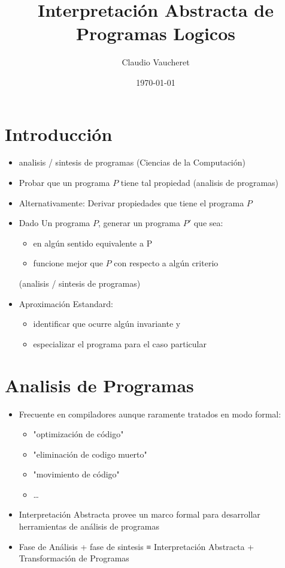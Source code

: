 \documentclass[11pt]{article}
\author{Claudio Vaucheret}
\date{\today}
\title{Interpretación Abstracta de Programas Logicos}
\begin{document}
\maketitle
\tableofcontents


\section*{Introducción}
\label{sec:org2daf528}

\begin{itemize}
\item analisis / sintesis de programas (Ciencias de la Computación)

\item Probar que un programa \(P\) tiene tal propiedad (analisis de programas)

\item Alternativamente: Derivar propiedades que tiene el programa \(P\)

\item Dado Un programa \(P\), generar un programa \(P'\) que sea:

\begin{itemize}
\item en algún sentido equivalente a P

\item funcione mejor que \(P\) con respecto a algún criterio
\end{itemize}
(analisis / sintesis de programas)

\item Aproximación Estandard:
\begin{itemize}
\item identificar que ocurre algún invariante y
\item especializar el programa para el caso particular
\end{itemize}
\end{itemize}

\section*{Analisis de Programas}
\label{sec:org3040579}

\begin{itemize}
\item Frecuente en compiladores aunque raramente tratados en modo formal:
\begin{itemize}
\item "optimización de código"
\item "eliminación de codigo muerto"
\item "movimiento de código"
\item \ldots{}
\end{itemize}
\item Interpretación Abstracta provee un marco formal para desarrollar
herramientas de análisis de programas
\item Fase de Análisis + fase de sintesis ≡ Interpretación Abstracta +
Transformación de Programas
\end{itemize}
\end{document}
